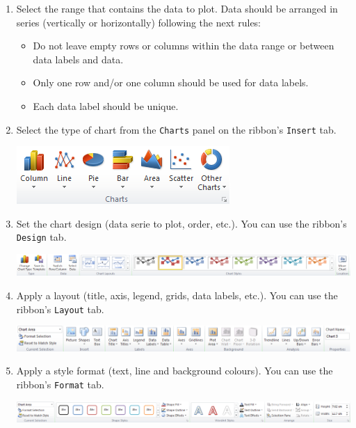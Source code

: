 \begin{enumerate}
\item Select the range that contains the data to plot. Data should be arranged in series (vertically or horizontally) following the next rules:


\begin{itemize}
\item Do not leave empty rows or columns within the data range or between data labels and data.
\item Only one row and/or one column should be used for data labels.
\item Each data label should be unique.
\end{itemize}
\item Select the type of chart from the \texttt{Charts} panel on the ribbon's \texttt{Insert} tab.

\begin{center}
\includegraphics[max width=\linewidth]{../img/panel_charts.png}
\end{center}

\item Set the chart design (data serie to plot, order, etc.). You can use the ribbon's \texttt{Design} tab.

\begin{center}
\includegraphics[max width=\linewidth]{../img/excel_2010_chart_design_ribbon.png}
\end{center}

\item Apply a layout (title, axis, legend, grids, data labels, etc.). You can use the ribbon's \texttt{Layout} tab.

\begin{center}
\includegraphics[max width=\linewidth]{../img/excel_2010_chart_layout_ribbon.png}
\end{center}

\item Apply a style format (text, line and background colours). You can use the ribbon's \texttt{Format} tab.

\begin{center}
\includegraphics[max width=\linewidth]{../img/excel_2010_chart_format_ribbon.png}
\end{center}
\end{enumerate}

